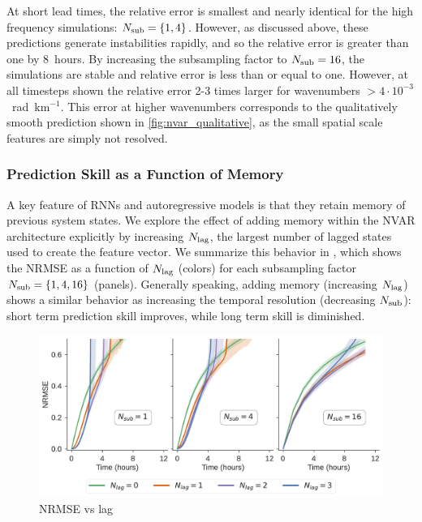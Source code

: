 At short lead times, the relative error is smallest and nearly
identical for the high frequency simulations: $N_\text{sub}=\{1,4\}$.
However, as discussed above,
these predictions generate instabilities rapidly, and so the relative error is
greater than one by 8~hours.
By increasing the subsampling factor to $N_\text{sub}=16$, the simulations are stable
and relative error is less than or equal to one.
However, at all timesteps shown the relative error 2-3 times larger for wavenumbers
$> 4\cdot10^{-3}$~rad~km$^{-1}$.
This error at higher wavenumbers corresponds to the qualitatively smooth
prediction shown in \cref{fig:nvar_qualitative}, as the small spatial scale
features are simply not resolved.


\subsubsection{Prediction Skill as a Function of Memory}

A key feature of RNNs and autoregressive models is that they retain memory of
previous system states.
We explore the effect of adding memory within the NVAR architecture explicitly
by increasing $N_\text{lag}$, the largest number of lagged states used to create the
feature vector.
We summarize this behavior in , which shows the NRMSE as a
function of $N_\text{lag}$ (colors) for each
subsampling factor $N_\text{sub} = \{1, 4, 16\}$ (panels).
Generally speaking, adding memory (increasing $N_\text{lag}$) shows a similar behavior as increasing the
temporal resolution (decreasing $N_\text{sub}$): short term prediction skill improves,
while long term skill is diminished.

\begin{figure}
    \centering
    \includegraphics[width=\textwidth]{../figures/nvar_nrmse_vs_memory.pdf}
    \caption{NRMSE vs lag}
    \label{fig:nvar_nrmse_vs_lag}
\end{figure}

